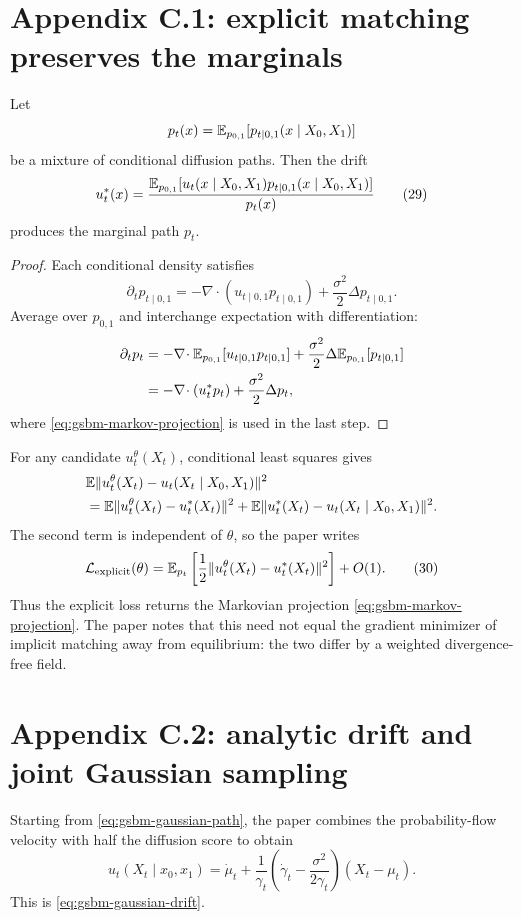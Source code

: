 \section{Appendix C.1: explicit matching preserves the marginals}
\label{sec:gsbm-lemma7}
\begin{lemma}[Lemma 7]
Let
\[
  p_t(x)=\mathbb{E}_{p_{0,1}}
  [p_{t\mid0,1}(x\mid X_0,X_1)]
\]
be a mixture of conditional diffusion paths.  Then the drift
\begin{equation}
  u_t^*(x)=
  \frac{
    \mathbb{E}_{p_{0,1}}
    [u_t(x\mid X_0,X_1)p_{t\mid0,1}(x\mid X_0,X_1)]
  }{p_t(x)}
  \tag{29}\label{eq:gsbm-markov-projection}
\end{equation}
produces the marginal path $p_t$.
\end{lemma}

\begin{proof}
Each conditional density satisfies
\[
  \partial_t p_{t\mid0,1}
  =-\nabla\!\cdot(u_{t\mid0,1}p_{t\mid0,1})
   +\frac{\sigma^2}{2}\Delta p_{t\mid0,1}.
\]
Average over $p_{0,1}$ and interchange expectation with differentiation:
\begin{align*}
  \partial_t p_t
  &=-\nabla\!\cdot
    \mathbb{E}_{p_{0,1}}[u_{t\mid0,1}p_{t\mid0,1}]
    +\frac{\sigma^2}{2}\Delta
    \mathbb{E}_{p_{0,1}}[p_{t\mid0,1}]\\
  &=-\nabla\!\cdot(u_t^*p_t)
    +\frac{\sigma^2}{2}\Delta p_t,
\end{align*}
where \eqref{eq:gsbm-markov-projection} is used in the last step.
\end{proof}

For any candidate $u_t^\theta(X_t)$, conditional least squares gives
\begin{align*}
 &\mathbb{E}\|u_t^\theta(X_t)-u_t(X_t\mid X_0,X_1)\|^2\\
 &=\mathbb{E}\|u_t^\theta(X_t)-u_t^*(X_t)\|^2
   +\mathbb{E}\|u_t^*(X_t)-u_t(X_t\mid X_0,X_1)\|^2.
\end{align*}
The second term is independent of $\theta$, so the paper writes
\begin{equation}
  \mathcal L_{\mathrm{explicit}}(\theta)
  =\mathbb{E}_{p_t}\left[
    \frac12\|u_t^\theta(X_t)-u_t^*(X_t)\|^2
  \right]+O(1).
  \tag{30}\label{eq:gsbm-explicit-square}
\end{equation}
Thus the explicit loss returns the Markovian projection
\eqref{eq:gsbm-markov-projection}.  The paper notes that this need not equal the
gradient minimizer of implicit matching away from equilibrium: the two differ by
a weighted divergence-free field.

\section{Appendix C.2: analytic drift and joint Gaussian sampling}
Starting from \eqref{eq:gsbm-gaussian-path}, the paper combines the
probability-flow velocity with half the diffusion score to obtain
\begin{equation}
  u_t(X_t\mid x_0,x_1)
  =\dot\mu_t
   +\frac1{\gamma_t}
    \left(\dot\gamma_t-\frac{\sigma^2}{2\gamma_t}\right)
    (X_t-\mu_t).
  \tag{31}\label{eq:gsbm-app-c-drift}
\end{equation}
This is \eqref{eq:gsbm-gaussian-drift}.

